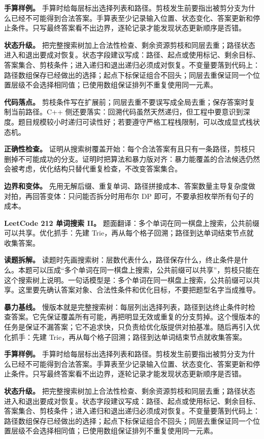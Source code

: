\textbf{手算样例。} 手算时给每层标出选择列表和路径。剪枝发生前要指出被剪分支为什么已经不可能得到合法答案。手算表至少记录输入位置、状态变化、答案更新和停止条件。只写最终答案看不出边界，逐轮记录才能发现状态更新顺序是否错。

\textbf{状态升级。} 把完整搜索树加上合法性检查、剩余资源剪枝和同层去重；路径状态进入和退出要成对恢复。状态字段建议写成：路径、起点或使用标记、剩余目标、答案集合、剪枝条件；进入递归和退出递归必须成对恢复。不变量要落到代码上：路径数组保存已经做出的选择；起点下标保证组合不回头；同层去重保证同一个位置层级不会选择相同值；已使用数组保证排列不重复使用同一元素。

\textbf{代码落点。} 剪枝条件写在扩展前；同层去重不要误写成全局去重；保存答案时复制当前路径。C++ 侧还要落实：回溯代码虽然天然递归，但工程中要意识到深度。题目规模较小时递归可读性好；若要遵守严格工程栈限制，可以改成显式栈状态机。

\textbf{正确性检查。} 证明从搜索树覆盖开始：每个合法答案有且只有一条路径，剪枝只删掉不可能成功的分支。证明时把算法和暴力版对齐：暴力能覆盖的合法候选仍然会被考虑，优化结构只替代重复检查，不改变答案集合。

\textbf{边界和变体。} 先用无解后缀、重复单词、路径拼接成本、答案数量主导复杂度做对拍，再回答变体：只问能否拆分时用布尔 DP 即可，不要承担枚举所有句子的成本。

\noindent\textbf{LeetCode 212 单词搜索 II。} 题面翻译：多个单词在同一棋盘上搜索，公共前缀可以共享。优化抓手：先建 Trie，再从每个格子回溯；路径到达单词结束节点就收集答案。

\textbf{读题拆解。} 读题时先画搜索树：层数代表什么，路径保存什么，终止条件是什么。本题可以压成“多个单词在同一棋盘上搜索，公共前缀可以共享”，剪枝只能在这个搜索树上说明。一句话模型是：多个单词在同一棋盘上搜索，公共前缀可以共享。这里要先确认答案对象、合法性条件和优化目标，不要把题型名字当成推导。

\textbf{暴力基线。} 慢版本就是完整搜索树：每层列出选择列表，路径到达终止条件时检查答案。它先保证覆盖所有可能，再把明显无效或重复的分支剪掉。这个慢版本的任务是保证不漏答案；它不追求快，只负责给优化版提供对拍基准。随后再引入优化抓手：先建 Trie，再从每个格子回溯；路径到达单词结束节点就收集答案。

\textbf{手算样例。} 手算时给每层标出选择列表和路径。剪枝发生前要指出被剪分支为什么已经不可能得到合法答案。手算表至少记录输入位置、状态变化、答案更新和停止条件。只写最终答案看不出边界，逐轮记录才能发现状态更新顺序是否错。

\textbf{状态升级。} 把完整搜索树加上合法性检查、剩余资源剪枝和同层去重；路径状态进入和退出要成对恢复。状态字段建议写成：路径、起点或使用标记、剩余目标、答案集合、剪枝条件；进入递归和退出递归必须成对恢复。不变量要落到代码上：路径数组保存已经做出的选择；起点下标保证组合不回头；同层去重保证同一个位置层级不会选择相同值；已使用数组保证排列不重复使用同一元素。

